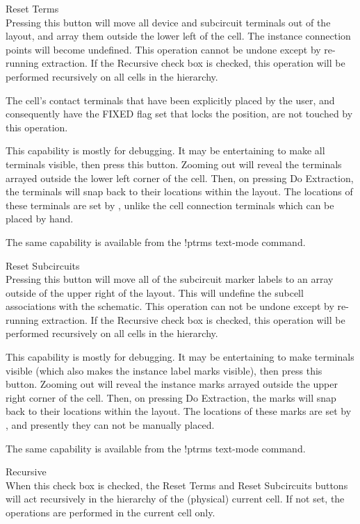\begin{description}
\item{\cb Reset Terms}\\
Pressing this button will move all device and subcircuit terminals out
of the layout, and array them outside the lower left of the cell.  The
instance connection points will become undefined.  This operation
cannot be undone except by re-running extraction.  If the
{\cb Recursive} check box is checked, this operation will be
performed recursively on all cells in the hierarchy.

The cell's contact terminals that have been explicitly placed by the
user, and consequently have the {\vt FIXED} flag set that locks the
position, are not touched by this operation.

This capability is mostly for debugging.  It may be entertaining to
make all terminals visible, then press this button.  Zooming out will
reveal the terminals arrayed outside the lower left corner of the
cell.  Then, on pressing {\cb Do Extraction}, the terminals will snap
back to their locations within the layout.  The locations of these
terminals are set by {\Xic}, unlike the cell connection terminals
which can be placed by hand.

The same capability is available from the {\cb !ptrms} text-mode
command.

\item{\cb Reset Subcircuits}\\
Pressing this button will move all of the subcircuit marker labels to
an array outside of the upper right of the layout.  This will undefine
the subcell associations with the schematic.  This operation can not
be undone except by re-running extraction.  If the {\cb Recursive}
check box is checked, this operation will be performed recursively on
all cells in the hierarchy.

This capability is mostly for debugging.  It may be entertaining to
make terminals visible (which also makes the instance label marks
visible), then press this button.  Zooming out will reveal the
instance marks arrayed outside the upper right corner of the cell. 
Then, on pressing {\cb Do Extraction}, the marks will snap back to
their locations within the layout.  The locations of these marks are
set by {\Xic}, and presently they can not be manually placed.

The same capability is available from the {\cb !ptrms} text-mode
command.

\item{\cb Recursive}\\
When this check box is checked, the {\cb Reset Terms} and {\cb Reset
Subcircuits} buttons will act recursively in the hierarchy of the
(physical) current cell.  If not set, the operations are performed in
the current cell only.


\end{description}
